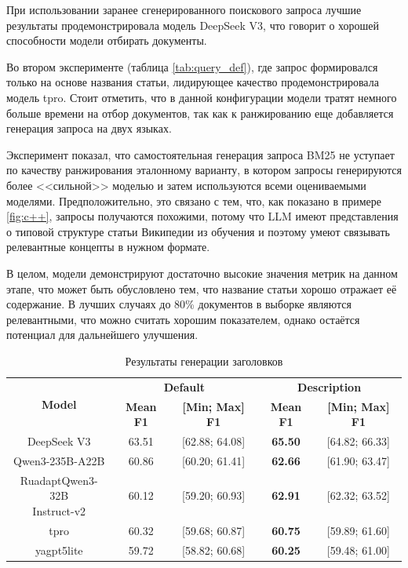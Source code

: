 \documentclass{article}
\theoremstyle{definition}
\theoremstyle{plain}
\begin{document}
При использовании заранее сгенерированного поискового запроса лучшие результаты продемонстрировала модель DeepSeek V3, что говорит о хорошей способности модели отбирать документы.

Во втором эксперименте (таблица \ref{tab:query_def}), где запрос формировался только на основе названия статьи, лидирующее качество продемонстрировала модель tpro. 
Стоит отметить, что в данной конфигурации модели тратят немного больше времени на отбор документов, так как к ранжированию еще добавляется генерация запроса на двух языках.

Эксперимент показал, что самостоятельная генерация запроса BM25 не уступает по качеству ранжирования эталонному варианту, в котором запросы генерируются более <<сильной>> моделью и затем
используются всеми оцениваемыми моделями. Предположительно, это связано с тем, что, как показано в примере \ref{fig:c++}, запросы получаются похожими, потому что
LLM имеют представления о типовой структуре статьи Википедии из обучения и поэтому умеют связывать релевантные концепты в нужном формате.

В целом, модели демонстрируют достаточно высокие значения метрик на данном этапе, что может быть обусловлено тем, что название статьи хорошо отражает её содержание. 
В лучших случаях до 80\% документов в выборке являются релевантными, что можно считать хорошим показателем, однако остаётся потенциал для дальнейшего улучшения.

\begin{table}[ht!]
\centering
\caption{Результаты генерации заголовков}
\begin{tabular}{c|cc|cc}
\hline
\multirow{2}{*}{\textbf{Model}} & \multicolumn{2}{c|}{\textbf{Default}} & \multicolumn{2}{c}{\textbf{Description}} \\
 & \textbf{Mean F1} & \textbf{[Min; Max] F1} & \textbf{Mean F1} & \textbf{[Min; Max] F1} \\
\hline
DeepSeek V3                               & 63.51 & [62.88; 64.08] & \textbf{65.50} & [64.82; 66.33] \\
Qwen3-235B-A22B                           & 60.86 & [60.20; 61.41] & \textbf{62.66} & [61.90; 63.47] \\
\hline
\makecell{RuadaptQwen3-32B\\Instruct-v2}  & 60.12 & [59.20; 60.93] & \textbf{62.91} & [62.32; 63.52] \\
\hline
tpro                                      & 60.32 & [59.68; 60.87] & \textbf{60.75} & [59.89; 61.60] \\
yagpt5lite                                & 59.72 & [58.82; 60.68] & \textbf{60.25} & [59.48; 61.00] \\
\hline
\end{tabular}
\end{table}
\end{document}
